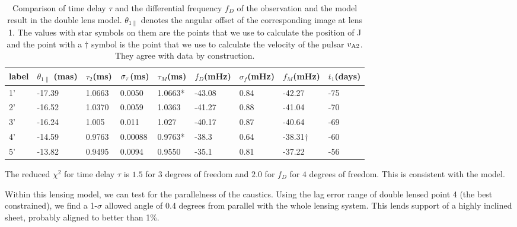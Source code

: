\documentclass[useAMS,usenatbib]{mn2e}
\begin{document}
\begin{table}
\centering
\begin{tabular}{lllllllll}
\hline
label&$\theta_{1\parallel}$ (mas)  & $\tau_2$(ms) & $\sigma_{\rm \tau}$(ms)  & $\tau_M$(ms) & $f_D$(mHz)  &$\sigma_{f}$(mHz)      &  $f_M$(mHz)& $t_1$(days) \\ \hline
1'&-17.39  &  1.0663     &0.0050    & 1.0663*        & -43.08    &0.84   & -42.27           & -75\\
 2'&-16.52  &    1.0370     &0.0059    & 1.0363       & -41.27    &0.88   & -41.04          & -70\\ 
3'&-16.24  &   1.005    &0.011   & 1.027          & -40.17    &0.87   & -40.64          & -69\\ 
 4'&-14.59  &   0.9763    &0.00088   & 0.9763*       & -38.3     &0.64    & -38.31$\dagger$ & -60\\ 
5'&-13.82  &    0.9495     &0.0094    & 0.9550       & -35.1     &0.81    & -37.22          & -56\\ 
 \hline
\end{tabular}
\caption{Comparison of time delay $\tau$ and the differential
  frequency $f_D$ of the observation and the model result in the
  double lens model. $\theta_{1\parallel}$ denotes the angular offset
  of the corresponding image at lens 1. 
The values with star symbols on them are the points that we use to
calculate the position of J and the point with a $\dagger$ symbol is
the point that we use to calculate the velocity of the pulsar $v_{\rm
  A2}$.  They agree with data by construction. }
\label{table:double_lens_compare}
\end{table}

The reduced ${\chi}^2$ for time delay $\tau$ is $1.5$
for $3$ degrees of freedom
and $2.0$ for $f_D$ for $4$ degrees of freedom.  This is consistent
with the model.


Within this lensing model, we can test for the parallelness of the
caustics.  Using the lag error range of double lensed point 4 (the best
constrained), we find a 1-$\sigma$ allowed angle of 0.4 degrees from
parallel with the whole lensing system.  This lends support of a
highly inclined sheet, probably aligned to better than 1\%.
\end{document}
